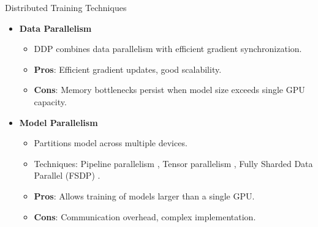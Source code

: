 \documentclass{beamer}
\begin{document}
\begin{frame}{Distributed Training Techniques}
    \begin{itemize}
        \item \textbf{Data Parallelism}
            \begin{itemize}
                \item DDP combines data parallelism with efficient gradient synchronization.
                \item \textbf{Pros}: Efficient gradient updates, good scalability.
                \item \textbf{Cons}: Memory bottlenecks persist when model size exceeds single GPU capacity.
            \end{itemize}
        \item \textbf{Model Parallelism}
            \begin{itemize}
                \item Partitions model across multiple devices.
                \item Techniques: Pipeline parallelism \citep{huangGPipeEfficientTraining2019}, Tensor parallelism \citep{shoeybiMegatronLMTuningScaling2019}, Fully Sharded Data Parallel (FSDP) \citep{zhaoExtendingTorchElasticStateful2020}.
                \item \textbf{Pros}: Allows training of models larger than a single GPU.
                \item \textbf{Cons}: Communication overhead, complex implementation.
            \end{itemize}
    \end{itemize}
\end{frame}
\end{document}
